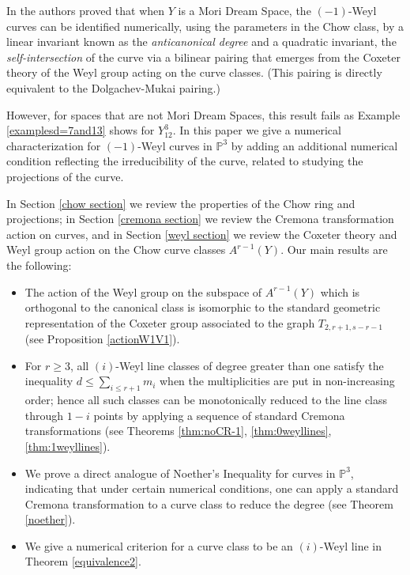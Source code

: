 \documentclass[12pt]{article}
\numberwithin{equation}{section}
\numberwithin{equation}{section}
\numberwithin{subeq}{equation}
\def\bbP{\mathbb{P}}
\begin{document}
In \cite{DM2} the authors proved that
when $Y$ is a Mori Dream Space,
the $(-1)$-Weyl curves can be identified numerically, using the parameters in the Chow class,
by a linear invariant known as the
\emph{anticanonical degree}
and a quadratic invariant,
the \emph{self-intersection} of the curve via a bilinear pairing
that emerges from the Coxeter theory of the Weyl group acting on the curve classes.
(This pairing is directly equivalent to the Dolgachev-Mukai pairing.)

However, for spaces that are not Mori Dream Spaces,
this result fails as Example \ref{examplesd=7and13} shows for $Y^3_{12}$.
In this paper we give a numerical characterization
for $(-1)$-Weyl curves in $\mathbb{P}^3$ 
by adding an additional numerical condition 
reflecting the irreducibility of the curve,
related to studying the projections of the curve.

In Section \ref{chow section}
we review the properties of the Chow ring and projections;
in Section \ref{cremona section}
we review the Cremona transformation action on curves,
and in Section \ref{weyl section}
we review the Coxeter theory and Weyl group action on the Chow curve classes $A^{r-1}(Y)$.
Our main results are the following:

\begin{itemize}
\item[(A)] The action of the Weyl group on the subspace of $A^{r-1}(Y)$ which is orthogonal to the canonical class is isomorphic to the standard geometric representation of the Coxeter group
associated to the graph $T_{2,r+1,s-r-1}$ (see Proposition \ref{actionW1V1}).
\item[(B)] For $r \geq 3$, all $(i)$-Weyl line classes of degree greater than one satisfy the inequality $d \leq \sum_{i\leq r+1} m_i$ when the multiplicities are put in non-increasing order; hence all such classes can be monotonically reduced to the line class through $1-i$ points by applying a sequence of standard Cremona transformations
(see Theorems \ref{thm:noCR-1}, \ref{thm:0weyllines}, \ref{thm:1weyllines}).
\item[(C)] We prove a direct analogue of Noether's Inequality for curves in $\bbP^3$,
indicating that under certain numerical conditions,
one can apply a standard Cremona transformation to a curve class to reduce the degree
(see Theorem \ref{noether}).
\item[(D)] We give a numerical criterion for a curve class to be an $(i)$-Weyl line in Theorem \ref{equivalence2}.
\end{itemize}
\end{document}
